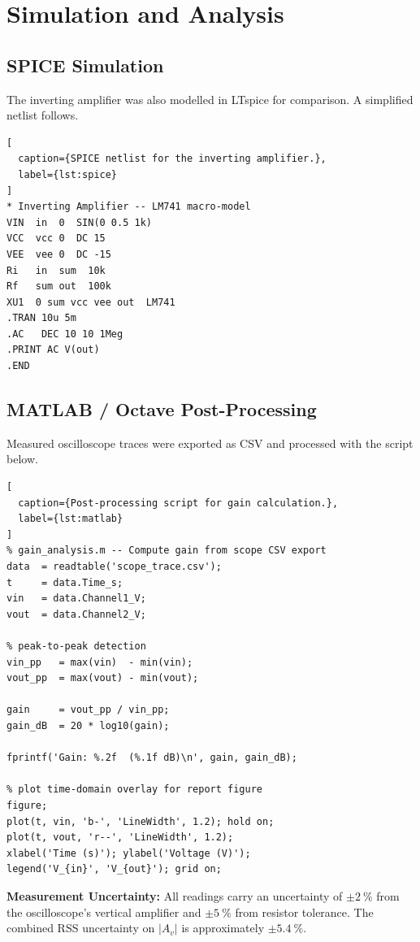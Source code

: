\section{Simulation and Analysis}

\subsection{SPICE Simulation}

The inverting amplifier was also modelled in LTspice for comparison.
A simplified netlist follows.

\begin{lstlisting}[
  caption={SPICE netlist for the inverting amplifier.},
  label={lst:spice}
]
* Inverting Amplifier -- LM741 macro-model
VIN  in  0  SIN(0 0.5 1k)
VCC  vcc 0  DC 15
VEE  vee 0  DC -15
Ri   in  sum  10k
Rf   sum out  100k
XU1  0 sum vcc vee out  LM741
.TRAN 10u 5m
.AC   DEC 10 10 1Meg
.PRINT AC V(out)
.END
\end{lstlisting}

\subsection{MATLAB / Octave Post-Processing}

Measured oscilloscope traces were exported as CSV and processed with the
script below.

\begin{lstlisting}[
  caption={Post-processing script for gain calculation.},
  label={lst:matlab}
]
% gain_analysis.m -- Compute gain from scope CSV export
data  = readtable('scope_trace.csv');
t     = data.Time_s;
vin   = data.Channel1_V;
vout  = data.Channel2_V;

% peak-to-peak detection
vin_pp   = max(vin)  - min(vin);
vout_pp  = max(vout) - min(vout);

gain     = vout_pp / vin_pp;
gain_dB  = 20 * log10(gain);

fprintf('Gain: %.2f  (%.1f dB)\n', gain, gain_dB);

% plot time-domain overlay for report figure
figure;
plot(t, vin, 'b-', 'LineWidth', 1.2); hold on;
plot(t, vout, 'r--', 'LineWidth', 1.2);
xlabel('Time (s)'); ylabel('Voltage (V)');
legend('V_{in}', 'V_{out}'); grid on;
\end{lstlisting}

\begin{infobox}
  \textbf{Measurement Uncertainty:} All readings carry an uncertainty
  of $\pm\qty{2}{\percent}$ from the oscilloscope's vertical amplifier
  and $\pm\qty{5}{\percent}$ from resistor tolerance.  The combined RSS
  uncertainty on $|A_v|$ is approximately $\pm\qty{5.4}{\percent}$.
\end{infobox}

